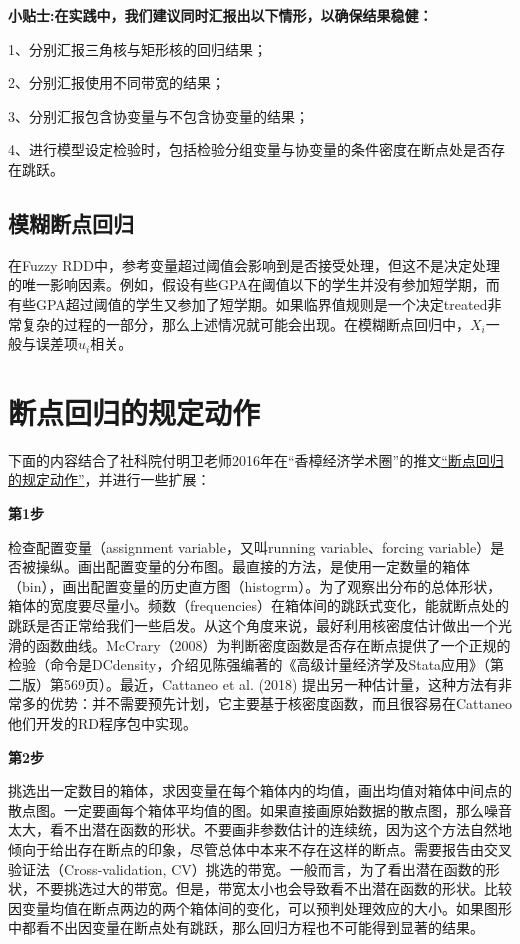 \documentclass[cn,12pt,math=newtx,citestyle=gb7714-2015,bibstyle=gb7714-2015]{elegantbook}
\begin{document}
	\textbf{小贴士:在实践中，我们建议同时汇报出以下情形，以确保结果稳健：}
	
	1、分别汇报三角核与矩形核的回归结果；
	
	2、分别汇报使用不同带宽的结果；
	
	3、分别汇报包含协变量与不包含协变量的结果；
	
	4、进行模型设定检验时，包括检验分组变量与协变量的条件密度在断点处是否存在跳跃。
	
	
	\subsection{模糊断点回归}
	
	在Fuzzy RDD中，参考变量超过阈值会影响到是否接受处理，但这不是决定处理的唯一影响因素。例如，假设有些GPA在阈值以下的学生并没有参加短学期，而有些GPA超过阈值的学生又参加了短学期。如果临界值规则是一个决定treated非常复杂的过程的一部分，那么上述情况就可能会出现。在模糊断点回归中，$X_i$一般与误差项$u_i$相关。
	
	\section{断点回归的规定动作}
	
	下面的内容结合了社科院付明卫老师2016年在“香樟经济学术圈”的推文\href{https://cec.blog.caixin.com/archives/193848}{“断点回归的规定动作”}，并进行一些扩展：
	
	\textbf{第1步}
	
	检查配置变量（assignment variable，又叫running variable、forcing variable）是否被操纵。画出配置变量的分布图。最直接的方法，是使用一定数量的箱体（bin），画出配置变量的历史直方图（histogrm）。为了观察出分布的总体形状，箱体的宽度要尽量小。频数（frequencies）在箱体间的跳跃式变化，能就断点处的跳跃是否正常给我们一些启发。从这个角度来说，最好利用核密度估计做出一个光滑的函数曲线。McCrary（2008）为判断密度函数是否存在断点提供了一个正规的检验（命令是DCdensity，介绍见陈强编著的《高级计量经济学及Stata应用》（第二版）第569页）。最近，Cattaneo et al. (2018) 提出另一种估计量，这种方法有非常多的优势：并不需要预先计划，它主要基于核密度函数，而且很容易在Cattaneo他们开发的RD程序包中实现。
	
	\textbf{第2步}
	
	挑选出一定数目的箱体，求因变量在每个箱体内的均值，画出均值对箱体中间点的散点图。一定要画每个箱体平均值的图。如果直接画原始数据的散点图，那么噪音太大，看不出潜在函数的形状。不要画非参数估计的连续统，因为这个方法自然地倾向于给出存在断点的印象，尽管总体中本来不存在这样的断点。需要报告由交叉验证法（Cross-validation, CV）挑选的带宽。一般而言，为了看出潜在函数的形状，不要挑选过大的带宽。但是，带宽太小也会导致看不出潜在函数的形状。比较因变量均值在断点两边的两个箱体间的变化，可以预判处理效应的大小。如果图形中都看不出因变量在断点处有跳跃，那么回归方程也不可能得到显著的结果。
	
\end{document}
